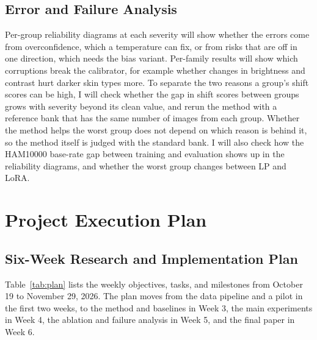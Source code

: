 \documentclass[sigconf,nonacm]{acmart}
\begin{document}
\subsection{Error and Failure Analysis}
\label{sec:failure}

Per-group reliability diagrams at each severity will show whether the errors come from overconfidence, which a temperature can fix, or from risks that are off in one direction, which needs the bias variant. Per-family results will show which corruptions break the calibrator, for example whether changes in brightness and contrast hurt darker skin types more. To separate the two reasons a group's shift scores can be high, I will check whether the gap in shift scores between groups grows with severity beyond its clean value, and rerun the method with a reference bank that has the same number of images from each group. Whether the method helps the worst group does not depend on which reason is behind it, so the method itself is judged with the standard bank. I will also check how the HAM10000 base-rate gap between training and evaluation shows up in the reliability diagrams, and whether the worst group changes between LP and LoRA.

\section{Project Execution Plan}
\label{sec:plan}

\subsection{Six-Week Research and Implementation Plan}

Table~\ref{tab:plan} lists the weekly objectives, tasks, and milestones from October 19 to November 29, 2026. The plan moves from the data pipeline and a pilot in the first two weeks, to the method and baselines in Week 3, the main experiments in Week 4, the ablation and failure analysis in Week 5, and the final paper in Week 6.
\end{document}
